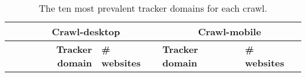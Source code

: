 \begin{table}[ht] 
\caption{The ten most prevalent tracker domains for each crawl.} 
\centering 
\begin{tabular}{|l|ll|ll|} 
\hline\textbf{} & \multicolumn{2}{c|}{\textbf{Crawl-desktop}} & \multicolumn{2}{c|}{\textbf{Crawl-mobile}} \\ \hline 
& \multicolumn{1}{r|}{\textbf{Tracker domain}} & \textbf{\# websites} & \multicolumn{1}{l|}{\textbf{Tracker domain}} & \textbf{\# websites} \\ \hline 
\end{tabular} 
\label{tab:TrackerTop10} 
\end{table}